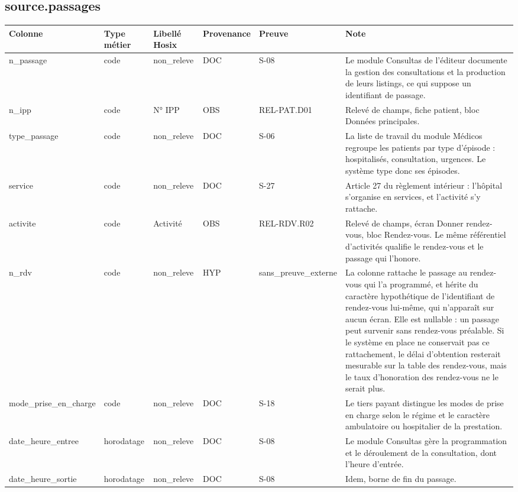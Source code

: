 \subsection*{source.passages}
\begin{longtable}{p{2.5cm}p{1.8cm}p{2.8cm}p{1.3cm}p{2.2cm}p{5cm}}
\hline
Colonne & Type métier & Libellé Hosix & Provenance & Preuve & Note \\
\hline
\endhead
n\_passage & code & non\_releve & DOC & S-08 & Le module Consultas de l'éditeur documente la gestion des consultations et la production de leurs listings, ce qui suppose un identifiant de passage. \\
n\_ipp & code & N° IPP & OBS & REL-PAT.D01 & Relevé de champs, fiche patient, bloc Données principales. \\
type\_passage & code & non\_releve & DOC & S-06 & La liste de travail du module Médicos regroupe les patients par type d'épisode : hospitalisés, consultation, urgences. Le système type donc ses épisodes. \\
service & code & non\_releve & DOC & S-27 & Article 27 du règlement intérieur : l'hôpital s'organise en services, et l'activité s'y rattache. \\
activite & code & Activité & OBS & REL-RDV.R02 & Relevé de champs, écran Donner rendez-vous, bloc Rendez-vous. Le même référentiel d'activités qualifie le rendez-vous et le passage qui l'honore. \\
n\_rdv & code & non\_releve & HYP & sans\_preuve\_externe & La colonne rattache le passage au rendez-vous qui l'a programmé, et hérite du caractère hypothétique de l'identifiant de rendez-vous lui-même, qui n'apparaît sur aucun écran. Elle est nullable : un passage peut survenir sans rendez-vous préalable. Si le système en place ne conservait pas ce rattachement, le délai d'obtention resterait mesurable sur la table des rendez-vous, mais le taux d'honoration des rendez-vous ne le serait plus. \\
mode\_prise\_en\_charge & code & non\_releve & DOC & S-18 & Le tiers payant distingue les modes de prise en charge selon le régime et le caractère ambulatoire ou hospitalier de la prestation. \\
date\_heure\_entree & horodatage & non\_releve & DOC & S-08 & Le module Consultas gère la programmation et le déroulement de la consultation, dont l'heure d'entrée. \\
date\_heure\_sortie & horodatage & non\_releve & DOC & S-08 & Idem, borne de fin du passage. \\

\end{longtable}
